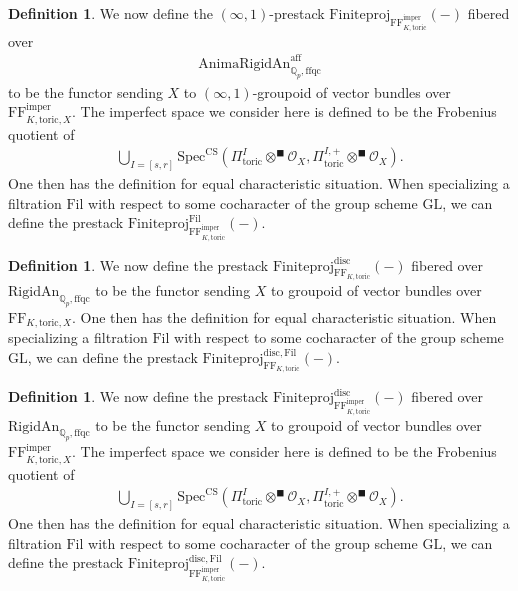 \documentclass[12pt]{article}
\theoremstyle{definition}
\newtheorem{definition}[theorem]{Definition}
\numberwithin{equation}{section}
\begin{document}
\begin{definition}
We now define the $(\infty,1)$-prestack $\mathrm{Finiteproj}_{\mathrm{FF}^\mathrm{imper}_{K,\mathrm{toric}}}(-)$ fibered over 
\begin{align}
\mathrm{AnimaRigidAn}^\mathrm{aff}_{\mathbb{Q}_p,\mathrm{ffqc}}
\end{align}
to be the functor sending $X$ to $(\infty,1)$-groupoid of vector bundles over $\mathrm{FF}^\mathrm{imper}_{K,\mathrm{toric},X}$. The imperfect space we consider here is defined to be the Frobenius quotient of
\begin{align}
\bigcup_{I=[s,r]}\mathrm{Spec}^\mathrm{CS}({\Pi}^I_{\mathrm{toric}}\otimes^\blacksquare \mathcal{O}_X,{\Pi}_{\mathrm{toric}}^{I,+}\otimes^\blacksquare \mathcal{O}_X).	
\end{align}
One then has the definition for equal characteristic situation. When specializing a filtration $\mathrm{Fil}$ with respect to some cocharacter of the group scheme $\mathrm{GL}$, we can define the prestack $\mathrm{Finiteproj}^{\mathrm{Fil}}_{\mathrm{FF}^\mathrm{imper}_{K,\mathrm{toric}}}(-)$.
\end{definition}

\begin{definition}
We now define the prestack $\mathrm{Finiteproj}^\mathrm{disc}_{\mathrm{FF}_{K,\mathrm{toric}}}(-)$ fibered over $\mathrm{RigidAn}_{\mathbb{Q}_p,\mathrm{ffqc}}$ to be the functor sending $X$ to groupoid of vector bundles over $\mathrm{FF}_{K,\mathrm{toric},X}$. One then has the definition for equal characteristic situation. When specializing a filtration $\mathrm{Fil}$ with respect to some cocharacter of the group scheme $\mathrm{GL}$, we can define the prestack $\mathrm{Finiteproj}^{\mathrm{disc},\mathrm{Fil}}_{\mathrm{FF}_{K,\mathrm{toric}}}(-)$.
\end{definition}


\begin{definition}
We now define the prestack $\mathrm{Finiteproj}^\mathrm{disc}_{\mathrm{FF}^\mathrm{imper}_{K,\mathrm{toric}}}(-)$ fibered over $\mathrm{RigidAn}_{\mathbb{Q}_p,\mathrm{ffqc}}$ to be the functor sending $X$ to groupoid of vector bundles over $\mathrm{FF}^\mathrm{imper}_{K,\mathrm{toric},X}$. The imperfect space we consider here is defined to be the Frobenius quotient of
\begin{align}
\bigcup_{I=[s,r]}\mathrm{Spec}^\mathrm{CS}({\Pi}^I_{\mathrm{toric}}\otimes^\blacksquare \mathcal{O}_X,{\Pi}_{\mathrm{toric}}^{I,+}\otimes^\blacksquare \mathcal{O}_X).	
\end{align}
One then has the definition for equal characteristic situation. When specializing a filtration $\mathrm{Fil}$ with respect to some cocharacter of the group scheme $\mathrm{GL}$, we can define the prestack $\mathrm{Finiteproj}^{\mathrm{disc},\mathrm{Fil}}_{\mathrm{FF}^\mathrm{imper}_{K,\mathrm{toric}}}(-)$.
\end{definition} 
\end{document}
